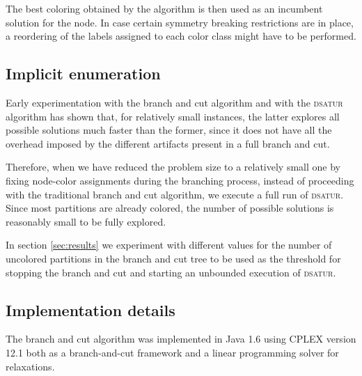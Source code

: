 The best coloring obtained by the algorithm is then used as an incumbent solution for the node. In case certain symmetry breaking restrictions are in place, a reordering of the labels assigned to each color class might have to be performed.

\subsection{Implicit enumeration}
\label{subsec:alg:implicit}

Early experimentation with the branch and cut algorithm and with the \textsc{dsatur} algorithm has shown that, for relatively small instances, the latter explores all possible solutions much faster than the former, since it does not have all the overhead imposed by the different artifacts present in a full branch and cut.

Therefore, when we have reduced the problem size to a relatively small one by fixing node-color assignments during the branching process, instead of proceeding with the traditional branch and cut algorithm, we execute a full run of \textsc{dsatur}. Since most partitions are already colored, the number of possible solutions is reasonably small to be fully explored.

In section \ref{sec:results} we experiment with different values for the number of uncolored partitions in the branch and cut tree to be used as the threshold for stopping the branch and cut and starting an unbounded execution of \textsc{dsatur}.

\subsection{Implementation details}

The branch and cut algorithm was implemented in Java 1.6 using CPLEX version 12.1 both as a branch-and-cut framework and a linear programming solver for relaxations. 

